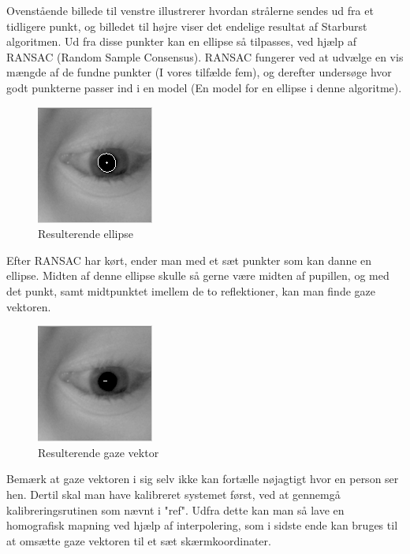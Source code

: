 \documentclass[rapport.tex]{subfiles}
\begin{document}
	Ovenstående billede til venstre illustrerer hvordan strålerne sendes ud fra et tidligere punkt, og billedet til højre viser det endelige resultat af Starburst algoritmen. Ud fra disse punkter kan en ellipse så tilpasses, ved hjælp af RANSAC (Random Sample Consensus). RANSAC fungerer ved at udvælge en vis mængde af de fundne punkter (I vores tilfælde fem), og derefter undersøge hvor godt punkterne passer ind i en model (En model for en ellipse i denne algoritme).
		
		
	\begin{figure}
	\centering
	\includegraphics[width=0.4\linewidth]{Billeder/Starburst,Ellipse.png}
	\caption{Resulterende ellipse}
	\label{fig:Starburst,Ellipse}
	\end{figure}
	
	Efter RANSAC har kørt, ender man med et sæt punkter som kan danne en ellipse. Midten af denne ellipse skulle så gerne være midten af pupillen, og med det punkt, samt midtpunktet imellem de to reflektioner, kan man finde gaze  vektoren.
	
	\begin{figure}
	\centering
	\includegraphics[width=0.4\linewidth]{Billeder/Starburst,Gaze.png}
	\caption{Resulterende gaze vektor}
	\label{fig:Starburst,Gaze}
	\end{figure}
	
	Bemærk at gaze vektoren i sig selv ikke kan fortælle nøjagtigt hvor en person ser hen. Dertil skal man have kalibreret systemet først, ved at gennemgå kalibreringsrutinen som nævnt i "ref". Udfra dette kan man så lave en homografisk mapning ved hjælp af interpolering, som i sidste ende kan bruges til at omsætte gaze vektoren til et sæt skærmkoordinater.
	
\end{document}
